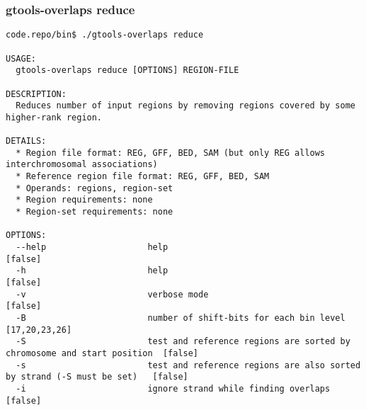 \subsubsection{gtools-overlaps reduce}\label{gtools-overlaps_reduce}
\begin{lstlisting}
code.repo/bin$ ./gtools-overlaps reduce

USAGE:
  gtools-overlaps reduce [OPTIONS] REGION-FILE

DESCRIPTION:
  Reduces number of input regions by removing regions covered by some higher-rank region.

DETAILS:
  * Region file format: REG, GFF, BED, SAM (but only REG allows interchromosomal associations)
  * Reference region file format: REG, GFF, BED, SAM
  * Operands: regions, region-set
  * Region requirements: none
  * Region-set requirements: none

OPTIONS:
  --help                    help                                                                    [false]
  -h                        help                                                                    [false]
  -v                        verbose mode                                                            [false]
  -B                        number of shift-bits for each bin level                                 [17,20,23,26]
  -S                        test and reference regions are sorted by chromosome and start position  [false]
  -s                        test and reference regions are also sorted by strand (-S must be set)   [false]
  -i                        ignore strand while finding overlaps                                    [false]
\end{lstlisting}
%
